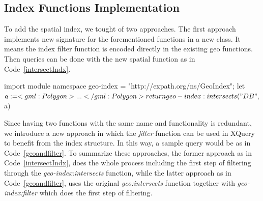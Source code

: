\documentclass[a4paper,12pt]{article}
\begin{document}
\subsection{Index Functions Implementation}
\label{indexFunc}
To add the spatial index, we tought of two approaches. The first approach implements new signature for the forementioned functions in a new class. It means the index filter function is encoded directly in the existing geo functions. Then queries can be done with the new spatial function as in Code~\ref{intersectIndx}.
\vspace{10px}
\begin{fakeXML}[label=intersectIndx,caption=The geo function containing the index functions]
import module namespace geo-index = "http://expath.org/ns/GeoIndex";
let $a:= <gml:Polygon> ... </gml:Polygon>
return geo-index:intersects("DB", $a) 
\end{fakeXML}

\vspace{10px}
\vspace{10px}

Since having two functions with the same name and functionality is redundant, we introduce a new approach in which the \textit{filter} function can be used in XQuery to benefit from the index structure. In this way, a sample query would be as in Code~\ref{geoandfilter}. To summarize these approaches, the former approach as in Code~\ref{intersectIndx}, does the whole process including the first step of filtering through the \textit{geo-index:intersects} function, while the latter approach as in Code~\ref{geoandfilter}, uses the original \textit{geo:intersects} function together with \textit{geo-index:filter} which does the first step of filtering. 
\end{document}
